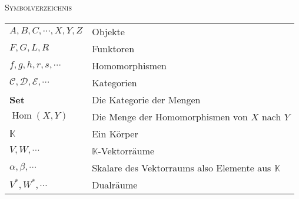 \documentclass[a4paper]{amsart}
\theoremstyle{definition}
\DeclareMathOperator{\Hom}{Hom}
\newcommand{\K}{\ensuremath{\mathbb{ K }}}
\begin{document}
\begin{large}
    \centerline{\textsc{Symbolverzeichnis}}
\end{large}
\bigskip

\renewcommand*{\arraystretch}{1}

\begin{tabular}{ll}
    $A, B, C, \cdots, X, Y, Z$          & Objekte\\
    $F,G,L,R$ & Funktoren\\
    $f, g, h, r, s, \cdots$   & Homomorphismen\\
    $\mathcal C, \mathcal D, \mathcal E, \cdots$ & Kategorien\\
    \textbf{Set} & Die Kategorie der Mengen\\
    $\Hom( X, Y)$ & Die Menge der Homomorphismen von $X$ nach $Y$\\
    $\K$         &Ein Körper\\
    $V, W, \cdots$ &$\K$-Vektorräume\\
    $\alpha, \beta, \cdots$ & Skalare des Vektorraums also Elemente aus $\K$\\
    $V^*, W^*, \cdots$ & Dualräume
\end{tabular}
\end{document}

